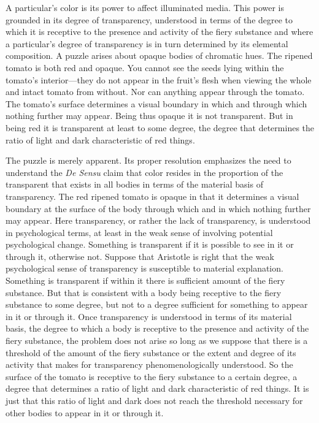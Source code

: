 A particular's color is its power to affect illuminated media. This power is grounded in its degree of transparency, understood in terms of the degree to which it is receptive to the presence and activity of the fiery substance and where a particular's degree of transparency is in turn determined by its elemental composition. A puzzle arises about opaque bodies of chromatic hues. The ripened tomato is both red and opaque. You cannot see the seeds lying within the tomato's interior---they do not appear in the fruit's flesh when viewing the whole and intact tomato from without. Nor can anything appear through the tomato. The tomato's surface determines a visual boundary in which and through which nothing further may appear. Being thus opaque it is not transparent. But in being red it is transparent at least to some degree, the degree that determines the ratio of light and dark characteristic of red things.

The puzzle is merely apparent. Its proper resolution emphasizes the need to understand the \emph{De Sensu} claim that color resides in the proportion of the transparent that exists in all bodies in terms of the material basis of transparency. The red ripened tomato is opaque in that it determines a visual boundary at the surface of the body through which and in which nothing further may appear. Here transparency, or rather the lack of transparency, is understood in psychological terms, at least in the weak sense of involving potential psychological change. Something is transparent if it is possible to see in it or through it, otherwise not. Suppose that Aristotle is right that the weak psychological sense of transparency is susceptible to material explanation. Something is transparent if within it there is sufficient amount of the fiery substance. But that is consistent with a body being receptive to the fiery substance to some degree, but not to a degree sufficient for something to appear in it or through it. Once transparency is understood in terms of its material basis, the degree to which a body is receptive to the presence and activity of the fiery substance, the problem does not arise so long as we suppose that there is a threshold of the amount of the fiery substance or the extent and degree of its activity that makes for transparency phenomenologically understood. So the surface of the tomato is receptive to the fiery substance to a certain degree, a degree that determines a ratio of light and dark characteristic of red things. It is just that this ratio of light and dark does not reach the threshold necessary for other bodies to appear in it or through it.

